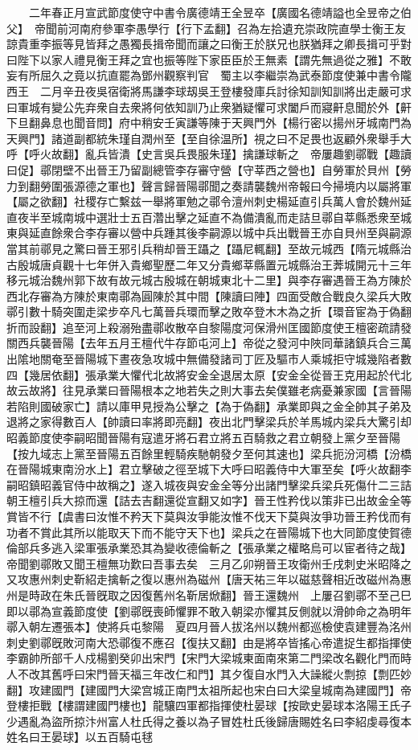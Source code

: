 　　二年春正月宣武節度使守中書令廣德靖王全昱卒【廣國名德靖謚也全昱帝之伯父】　帝聞前河南府參軍李愚學行【行下孟翻】召為左拾遺充崇政院直學士衡王友諒貴重李振等見皆拜之愚獨長揖帝聞而讓之曰衡王於朕兄也朕猶拜之卿長揖可乎對曰陛下以家人禮見衡王拜之宜也振等陛下家臣臣於王無素【謂先無過從之雅】不敢妄有所屈久之竟以抗直罷為鄧州觀察判官　蜀主以李繼崇為武泰節度使兼中書令隴西王　二月辛丑夜吳宿衛將馬謙李球刼吳王登樓發庫兵討徐知訓知訓將出走嚴可求曰軍城有變公先弃衆自去衆將何依知訓乃止衆猶疑懼可求闔戶而寢鼾息聞於外【鼾下旦翻鼻息也聞音問】府中稍安壬寅謙等陳于天興門外【楊行密以揚州牙城南門為天興門】諸道副都統朱瑾自潤州至【至自徐温所】視之曰不足畏也返顧外衆舉手大呼【呼火故翻】亂兵皆潰【史言吳兵畏服朱瑾】擒謙球斬之　帝屢趣劉鄩戰【趣讀曰促】鄩閉壁不出晉王乃留副總管李存審守營【守莘西之營也】自勞軍於貝州【勞力到翻勞圍張源德之軍也】聲言歸晉陽鄩聞之奏請襲魏州帝報曰今掃境内以屬將軍【屬之欲翻】社稷存亡繫兹一舉將軍勉之鄩令澶州刺史楊延直引兵萬人會於魏州延直夜半至城南城中選壯士五百濳出擊之延直不為備潰亂而走詰旦鄩自莘縣悉衆至城東與延直餘衆合李存審以營中兵踵其後李嗣源以城中兵出戰晉王亦自貝州至與嗣源當其前鄩見之驚曰晉王邪引兵稍却晉王躡之【躡尼輒翻】至故元城西【隋元城縣治古殷城唐貞觀十七年併入貴鄉聖歷二年又分貴鄉莘縣置元城縣治王莾城開元十三年移元城治魏州郭下故有故元城古殷城在朝城東北十二里】與李存審遇晉王為方陳於西北存審為方陳於東南鄩為圓陳於其中間【陳讀曰陣】四面受敵合戰良久梁兵大敗鄩引數十騎突圍走梁步卒凡七萬晉兵環而擊之敗卒登木木為之折【環音宦為于偽翻折而設翻】追至河上殺溺殆盡鄩收散卒自黎陽度河保滑州匡國節度使王檀密疏請發關西兵襲晉陽【去年五月王檀代牛存節屯河上】帝從之發河中陜同華諸鎮兵合三萬出隂地關奄至晉陽城下晝夜急攻城中無備發諸司丁匠及驅市人乘城拒守城幾陷者數四【幾居依翻】張承業大懼代北故將安金全退居太原【安金全從晉王克用起於代北故云故將】往見承業曰晉陽根本之地若失之則大事去矣僕雖老病憂兼家國【言晉陽若陷則國破家亡】請以庫甲見授為公擊之【為于偽翻】承業即與之金全帥其子弟及退將之家得數百人【帥讀曰率將即亮翻】夜出北門擊梁兵於羊馬城内梁兵大驚引却昭義節度使李嗣昭聞晉陽有寇遣牙將石君立將五百騎救之君立朝發上黨夕至晉陽【按九域志上黨至晉陽五百餘里輕騎疾馳朝發夕至何其速也】梁兵扼汾河橋【汾橋在晉陽城東南汾水上】君立擊破之徑至城下大呼曰昭義侍中大軍至矣【呼火故翻李嗣昭鎮昭義官侍中故稱之】遂入城夜與安金全等分出諸門擊梁兵梁兵死傷什二三詰朝王檀引兵大掠而還【詰去吉翻還從宣翻又如字】晉王性矜伐以策非已出故金全等賞皆不行【虞書曰汝惟不矜天下莫與汝爭能汝惟不伐天下莫與汝爭功晉王矜伐而有功者不賞此其所以能取天下而不能守天下也】梁兵之在晉陽城下也大同節度使賀德倫部兵多逃入梁軍張承業恐其為變收德倫斬之【張承業之權略烏可以宦者待之哉】帝聞劉鄩敗又聞王檀無功歎曰吾事去矣　三月乙卯朔晉王攻衛州壬戌刺史米昭降之又攻惠州刺史靳紹走擒斬之復以惠州為磁州【唐天祐三年以磁慈聲相近改磁州為惠州是時政在朱氏晉旣取之因復舊州名靳居焮翻】晉王還魏州　上屢召劉鄩不至己巳即以鄩為宣義節度使【劉鄩旣喪師懼罪不敢入朝梁亦懼其反側就以滑帥命之為明年鄩入朝左遷張本】使將兵屯黎陽　夏四月晉人拔洺州以魏州都巡檢使袁建豐為洺州刺史劉鄩旣敗河南大恐鄩復不應召【復扶又翻】由是將卒皆搖心帝遣捉生都指揮使李霸帥所部千人戍楊劉癸卯出宋門【宋門大梁城東面南來第二門梁改名觀化門而時人不改其舊呼曰宋門晉天福三年改仁和門】其夕復自水門入大譟縱火剽掠【剽匹妙翻】攻建國門【建國門大梁宫城正南門太祖所起也宋白曰大梁皇城南為建國門】帝登樓拒戰【樓謂建國門樓也】龍驤四軍都指揮使杜晏球【按歐史晏球本洛陽王氏子少遇亂為盜所掠汴州富人杜氏得之養以為子冒姓杜氏後歸唐賜姓名曰李紹虔尋復本姓名曰王晏球】以五百騎屯毬